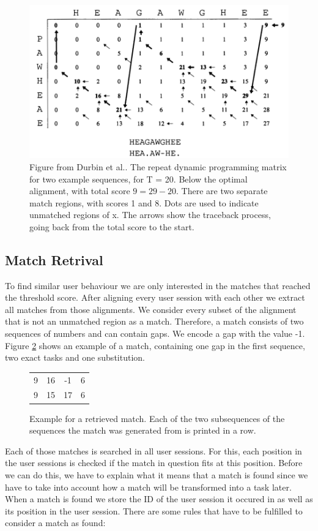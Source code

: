 \begin{figure}
\centering
\includegraphics[scale=0.4]{chapters/approach/smithwatermanrepeated.png}
\caption{Figure from Durbin et al.\cite{durbin1998}. The repeat dynamic programming matrix for two example sequences, for T = 20. Below the optimal alignment, with total score \mbox{$9 = 29-20$}. There are two separate match regions, with scores 1 and 8. Dots are used to indicate unmatched regions of x. The arrows show the traceback process, going back from the total score to the start.}
\label{fig:durbindpmatrixtraceback}
\end{figure}

\subsection{Match Retrival}
To find similar user behaviour we are only interested in the matches that reached the threshold score.
After aligning every user session with each other we extract all matches from those alignments.
We consider every subset of the alignment that is not an unmatched region as a match.
Therefore, a match consists of two sequences of numbers and can contain gaps.
We encode a gap with the value -1.
Figure \ref{fig:matchexample} shows an example of a match, containing one gap in the first sequence, two exact tasks and one substitution.

\begin{figure}[h]
	\centering
	\begin{tabular}{cccc}
		9 & 16 & -1 & 6 \\
		9 & 15 & 17 & 6
	\end{tabular}
	\caption{Example for a retrieved match. Each of the two subsequences of the sequences the match was generated from is printed in a row.}
	\label{fig:matchexample}
\end{figure}
Each of those matches is searched in all user sessions.
For this, each position in the user sessions is checked if the match in question fits at this position.
Before we can do this, we have to explain what it means that a match is found since we have to take into account how a match will be transformed into a task later.
When a match is found we store the ID of the user session it occured in as well as its position in the user session.
There are some rules that have to be fulfilled to consider a match as found:

